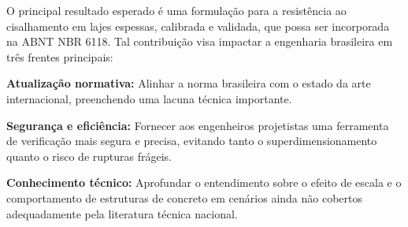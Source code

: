 O principal resultado esperado é uma formulação para a resistência ao cisalhamento em lajes espessas, calibrada e validada, que possa ser incorporada na ABNT NBR 6118. Tal contribuição visa impactar a engenharia brasileira em três frentes principais:

\begin{alineas}
   \item \textbf{Atualização normativa:} Alinhar a norma brasileira com o estado da arte internacional, preenchendo uma lacuna técnica importante.
    \item \textbf{Segurança e eficiência:} Fornecer aos engenheiros projetistas uma ferramenta de verificação mais segura e precisa, evitando tanto o superdimensionamento quanto o risco de rupturas frágeis.
    \item \textbf{Conhecimento técnico:} Aprofundar o entendimento sobre o efeito de escala e o comportamento de estruturas de concreto em cenários ainda não cobertos adequadamente pela literatura técnica nacional.
\end{alineas}

\postextual


\printbibliography

